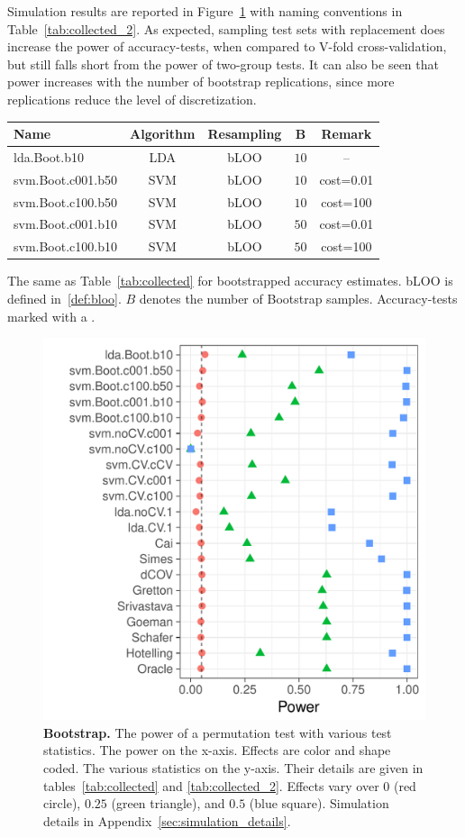 \documentclass[]{bio}
\begin{document}
Simulation results are reported in Figure~\ref{fig:bootstrap} with naming conventions in Table~\ref{tab:collected_2}.
As expected, sampling test sets with replacement does increase the power of accuracy-tests, when compared to V-fold cross-validation, but still falls short from the power of two-group tests. 
It can also be seen that power increases with the number of bootstrap replications, since more replications reduce the level of discretization.

\bigskip

\begin{tcolorbox}
	\centering
	\footnotesize
	\begin{tabular}{l|c|c|c|c}
		Name & Algorithm & Resampling & B  & Remark\\ 
		\hline
		\hline
		\cue lda.Boot.b10 & LDA & bLOO 	& $10$ &  -- \\ 
		\cue svm.Boot.c001.b50 & SVM & bLOO 	& $10$ & cost=0.01 \\ 
		\cue svm.Boot.c100.b50 & SVM & bLOO 	& $10$ & cost=100 \\ 
		\cue svm.Boot.c001.b10 & SVM & bLOO 	& $50$ & cost=0.01 \\ 
		\cue svm.Boot.c100.b10 & SVM & bLOO 	& $50$ & cost=100 \\ 
	\end{tabular} 
	\captionsetup{type=table}
	\caption{\footnotesize
		The same as Table~\ref{tab:collected} for bootstrapped accuracy estimates. 
		bLOO is defined in~\ref{def:bloo}.
		$B$ denotes the number of Bootstrap samples.
		Accuracy-tests marked with a \cue.} 
	\label{tab:collected_2}
\end{tcolorbox}


\begin{figure}[ht]
	\centering
	\includegraphics[width=0.5\columnwidth]{"art/file13"}
	\caption{
		\textbf{Bootstrap.}
		The power of a permutation test with various test statistics. 
		The power on the x-axis. 
		Effects are color and shape coded. 
		The various statistics on the y-axis. 
		Their details are given in tables~\ref{tab:collected} and \ref{tab:collected_2}. 
		Effects vary over $0$ (red circle), $0.25$ (green triangle), and $0.5$ (blue square). 
		Simulation details in Appendix~\ref{sec:simulation_details}.
	} 
	\label{fig:bootstrap}
\end{figure}
\end{document}
